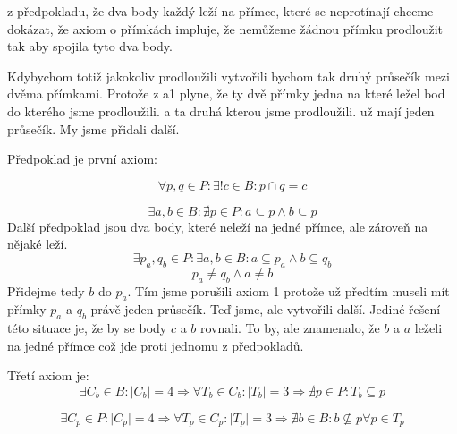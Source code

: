 \documentclass{article}
\begin{document}
z předpokladu, že dva body každý leží na přímce, které se neprotínají chceme
dokázat, že axiom o přímkách impluje, že nemůžeme žádnou přímku prodloužit tak
aby spojila tyto dva body. 

Kdybychom totiž jakokoliv prodloužili vytvořili bychom tak druhý průsečík mezi
dvěma přímkami. Protože z a1 plyne, že ty dvě přímky jedna na které ležel bod do
kterého jsme prodloužili. a ta druhá kterou jsme prodloužili. už mají jeden
průsečík. My jsme přidali další.



Předpoklad je první axiom:

\[
 \forall p,q \in P: \exists! c \in B:p \cap q = c
\]


\[
 \exists a,b \in B:\nexists p \in  P: a \subseteq p \wedge b \subseteq p
\]
Další předpoklad jsou dva body, které neleží na jedné přímce, ale zároveň na
nějaké leží.
\[
 \exists p_a,q_b \in P: \exists a,b \in B: a \subseteq p_a \wedge b \subseteq
 q_b
\]
\[
 p_a \neq q_b \wedge a \neq b
\]
Přidejme tedy $b$ do $p_a$. Tím jsme porušili axiom 1 protože už předtím museli
mít přímky $p_a$ a $q_b$ právě jeden průsečík. Teď jsme, ale vytvořili další.
Jediné řešení této situace je, že by se body $c$ a $b$ rovnali. To by, ale
znamenalo, že $b$ a $a$ leželi na jedné přímce což jde proti jednomu z
předpokladů.

Třetí axiom je:
\[
 \exists C_b \in B: \mid C_b \mid =4 \Rightarrow \forall T_b \in C_b : \mid T_b \mid=3
 \Rightarrow \nexists p \in  P: T_b \subseteq p
\]

\[
 \exists C_p \in  P: \mid C_p \mid  = 4 \Rightarrow \forall T_p \in  C_p: \mid T_p
 \mid=3 \Rightarrow  \nexists b \in B: b \nsubseteq  p \forall p \in  T_p
\]
\end{document}
